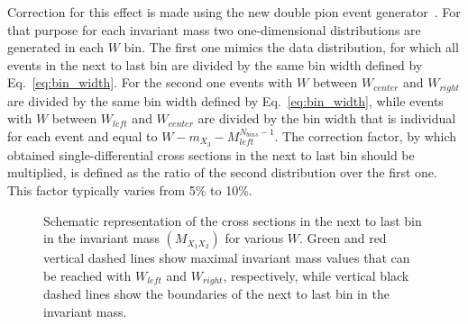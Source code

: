 Correction for this effect is made using the new double pion event generator~\cite{Skorodum:EG}. For that purpose for each invariant mass two  one-dimensional distributions are generated in each $W$ bin. The first one mimics the data distribution, for which all events in the next to last bin are divided by the same bin width defined by Eq.~\ref{eq:bin_width}.  For the second one events with $W$ between $W_{center}$ and $W_{right}$ are divided by the same bin width defined by Eq.~\ref{eq:bin_width}, while events with $W$ between $W_{left}$ and $W_{center}$ are divided by the bin width that is individual for each event and equal to $W - m_{X_{3}} - M_{left}^{N_{bins}-1}$. The correction factor, by which obtained single-differential cross sections in the next to last bin should be multiplied, is defined as the ratio of the second distribution over the first one. This factor typically varies from 5\% to 10\%. 


\begin{figure}[htp]
\begin{center}
\caption{\small Schematic representation of the cross sections in the next to last bin in the invariant mass $(M_{X_{1}X_{2}})$ for various $W$. Green and red vertical dashed lines show  maximal invariant mass values that can be reached with $W_{left}$ and $W_{right}$, respectively, while vertical black dashed lines show the boundaries of the next to last bin in the invariant mass.  \label{fig:mass_corr}}
\end{center}
\end{figure}



